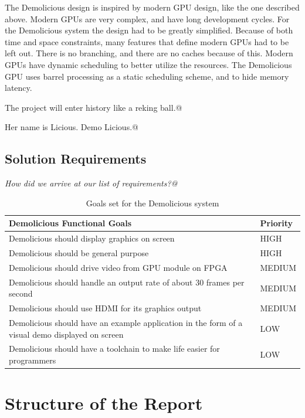 \documentclass[../main/report.tex]{subfiles}
\begin{document}
The Demolicious design is inspired by modern GPU design, like the one described above.
Modern GPUs are very complex, and have long development cycles.
For the Demolicious system the design had to be greatly simplified.
Because of both time and space constraints, many features that define modern GPUs had to be left out.
There is no branching, and there are no caches because of this.
Modern GPUs have dynamic scheduling to better utilize the resources.
The Demolicious GPU uses barrel processing as a static scheduling scheme, and to hide memory latency.


The project will enter history like a reking ball.@

Her name is Licious. Demo Licious.@

\subsection{Solution Requirements}

\textit{How did we arrive at our list of requirements?@}

\begin{table}[htp]
    \centering
    \begin{tabular}{|p{8cm}|l|}
        \hline
        \textbf{Demolicious Functional Goals}                & \textbf{Priority} \\ \hline
        Demolicious should display graphics on screen                           & HIGH    \\ \hline
        Demolicious should be general purpose                                   & HIGH    \\ \hline
        Demolicious should drive video from GPU module on FPGA                  & MEDIUM  \\ \hline
        Demolicious should handle an output rate of about 30 frames per second  & MEDIUM  \\ \hline
        Demolicious should use HDMI for its graphics output	                    & MEDIUM  \\ \hline
        Demolicious should have an example application in the form of a visual demo displayed on screen & LOW \\ \hline
        Demolicious should have a toolchain to make life easier for programmers & LOW     \\ \hline
    \end{tabular}
    \caption{Goals set for the Demolicious system}
    \label{tab:goals}
\end{table}

\newpage
\section{Structure of the Report}

\end{document}
